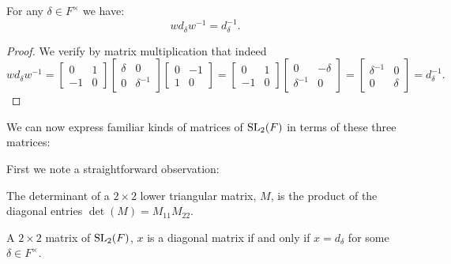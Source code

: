 \begin{lemma}
\label{SpecialMatrices.w_mul_d_eq_d_inv_w}
\leanok
For any $\delta \in F^\times$ we have:
\[ 
w d_\delta w^{-1} = d^{-1}_\delta.
\]
\end{lemma}

\begin{proof} 
We verify by matrix multiplication that indeed
\begin{equation*}
w d_\delta w^{-1} = \begin{bmatrix} 0 & 1 \\ - 1 & 0 \end{bmatrix} \begin{bmatrix} \delta & 0 \\ 0 & \delta^{-1} \end{bmatrix} \begin{bmatrix} 0 & - 1 \\ 1 & 0 \end{bmatrix} =  \begin{bmatrix} 0 & 1 \\ - 1 & 0 \end{bmatrix} \begin{bmatrix} 0 & - \delta \\ \delta^{-1} & 0 \end{bmatrix} \! = \! \begin{bmatrix} \delta^{-1} & 0 \\ 0 & \delta \end{bmatrix} \!= d^{-1}_\delta. 
\end{equation*}
\end{proof}

We can now express familiar kinds of matrices of $\operatorname{SL}_2(F)$ in terms of these three matrices:

First we note a straightforward observation:
\begin{remark}
    \label{det_eq_mul_diag_of_lower_triangular}
    \leanok
    The determinant of a $2 \times 2$ lower triangular matrix, $M$, is the product of the diagonal entries $\det(M) = M_{11} M_{22}$.
\end{remark}


\begin{remark}
    \label{SpecialLinearGroup.fin_two_diagonal_iff}
    \leanok
    A $2 \times 2$ matrix of $\operatorname{SL}_2(F)$, $x$ is a diagonal matrix if and only if $x = d_\delta$ for some $\delta \in F^\times$.
\end{remark}

